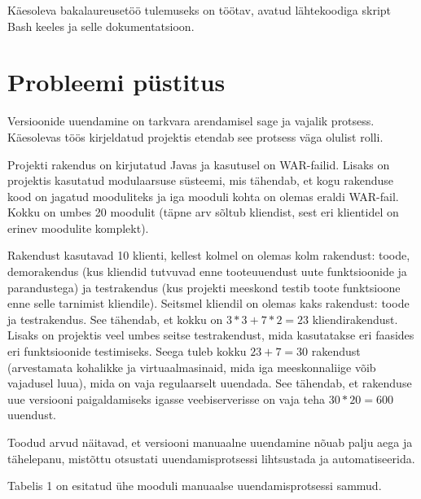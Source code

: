 \documentclass[12pt]{article}
\begin{document}
  Käesoleva bakalaureusetöö tulemuseks on töötav, avatud lähtekoodiga skript Bash keeles ja selle dokumentatsioon.
  
  \newpage
  
  \section{Probleemi püstitus}
  
  Versioonide uuendamine on tarkvara arendamisel sage ja vajalik protsess. Käes\-olevas töös kirjeldatud projektis etendab see protsess väga olulist rolli.
  
  Projekti rakendus on kirjutatud Javas ja kasutusel on WAR\--failid. Lisaks on projektis kasutatud modulaarsuse süsteemi, mis tähendab, et kogu rakenduse kood on jagatud mooduliteks ja iga mooduli kohta on olemas eraldi WAR\--fail. Kokku on umbes 20 moodulit (täpne arv sõltub kliendist, sest eri klientidel on erinev moodulite komplekt).
  
  Rakendust kasutavad 10 klienti, kellest kolmel on olemas kolm rakendust: toode, demorakendus (kus kliendid tutvuvad enne tooteuuendust uute funktsioonide ja parandustega) ja testrakendus (kus projekti meeskond testib toote funktsioone enne selle tarnimist kliendile). Seitsmel kliendil on olemas kaks rakendust: toode ja testrakendus. See tähendab, et kokku on $3*3+7*2=23$ kliendirakendust. Lisaks on projektis veel umbes seitse testrakendust, mida kasutatakse eri faasides eri funktsioonide testimiseks. Seega tuleb kokku $23+7=30$ rakendust (arvestamata kohalikke ja virtuaalmasinaid, mida iga meeskonnaliige võib vajadusel luua), mida on vaja regulaarselt uuendada. See tähendab, et rakenduse uue versiooni paigaldamiseks igasse veebiserverisse on vaja teha $30*20=600$ uuendust.
  
  Toodud arvud näitavad, et versiooni manuaalne uuendamine nõuab palju aega ja tähelepanu, mistõttu otsustati uuendamisprotsessi lihtsustada ja automatiseerida.
    
  Tabelis 1 on esitatud ühe mooduli manuaalse uuendamisprotsessi sammud.
  
\end{document}
